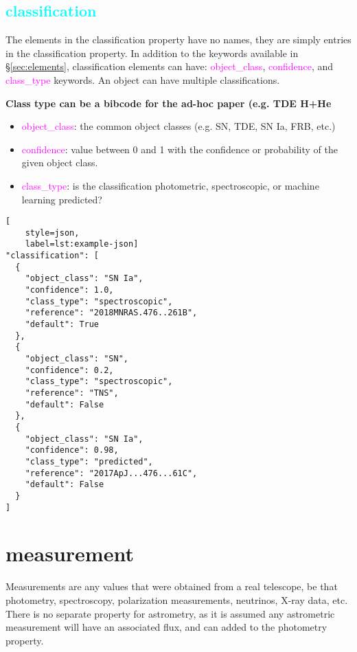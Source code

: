 \documentclass[tighten]{aastex631}
\newcommand{\property}[1]{\textcolor{cyan}{#1}}
\newcommand{\keyword}[1]{\textcolor{magenta}{#1}}
\begin{document}
\subsection{\property{classification}} \label{sec:classification}

The elements in the classification property have no names, they are simply entries in the classification property. In addition to the keywords available in \S\ref{sec:elements}, classification elements can have: \keyword{object\_class}, \keyword{confidence}, and \keyword{class\_type} keywords. An object can have multiple classifications.

\textbf{Class type can be a bibcode for the ad-hoc paper (e.g. TDE H+He}

\begin{itemize}
    \item \keyword{object\_class}: the common object classes (e.g. SN, TDE, SN Ia, FRB, etc.)
    \item \keyword{confidence}: value between 0 and 1 with the confidence or probability of the given object class.
    \item \keyword{class\_type}: is the classification photometric, spectroscopic, or machine learning predicted?
\end{itemize}

\begin{lstlisting}[
    style=json,
    label=lst:example-json]
"classification": [
  {
    "object_class": "SN Ia",
    "confidence": 1.0,
    "class_type": "spectroscopic",
    "reference": "2018MNRAS.476..261B",
    "default": True
  },
  {
    "object_class": "SN",
    "confidence": 0.2,
    "class_type": "spectroscopic",
    "reference": "TNS",
    "default": False
  },
  {
    "object_class": "SN Ia",
    "confidence": 0.98,
    "class_type": "predicted",
    "reference": "2017ApJ...476...61C",
    "default": False
  }
]
\end{lstlisting}



\section{measurement} \label{sec:measurement}

Measurements are any values that were obtained from a real telescope, be that photometry, spectroscopy, polarization measurements, neutrinos, X-ray data, etc. There is no separate property for astrometry, as it is assumed any astrometric measurement will have an associated flux, and can added to the photometry property.
\end{document}
